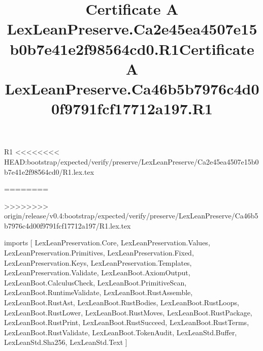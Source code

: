 \begin{lexlean}{R1}
<<<<<<<< HEAD:bootstrap/expected/verify/preserve/LexLeanPreserve/Ca2e45ea4507e15b0b7e41e2f98564cd0/R1.lex.tex
\title{Certificate A LexLeanPreserve.Ca2e45ea4507e15b0b7e41e2f98564cd0.R1}
========
\title{Certificate A LexLeanPreserve.Ca46b5b7976c4d00f9791fcf17712a197.R1}
>>>>>>>> origin/release/v0.4:bootstrap/expected/verify/preserve/LexLeanPreserve/Ca46b5b7976c4d00f9791fcf17712a197/R1.lex.tex
\begin{coremodule}
imports [
  LexLeanPreservation.Core,
  LexLeanPreservation.Values,
  LexLeanPreservation.Primitives,
  LexLeanPreservation.Fixed,
  LexLeanPreservation.Keys,
  LexLeanPreservation.Templates,
  LexLeanPreservation.Validate,
  LexLeanBoot.AxiomOutput,
  LexLeanBoot.CalculusCheck,
  LexLeanBoot.PrimitiveScan,
  LexLeanBoot.RuntimeValidate,
  LexLeanBoot.RustAssemble,
  LexLeanBoot.RustAst,
  LexLeanBoot.RustBodies,
  LexLeanBoot.RustLoops,
  LexLeanBoot.RustLower,
  LexLeanBoot.RustMoves,
  LexLeanBoot.RustPackage,
  LexLeanBoot.RustPrint,
  LexLeanBoot.RustSucceed,
  LexLeanBoot.RustTerms,
  LexLeanBoot.RustValidate,
  LexLeanBoot.TokenAudit,
  LexLeanStd.Buffer,
  LexLeanStd.Sha256,
  LexLeanStd.Text
]


\end{coremodule}
\end{lexlean}
